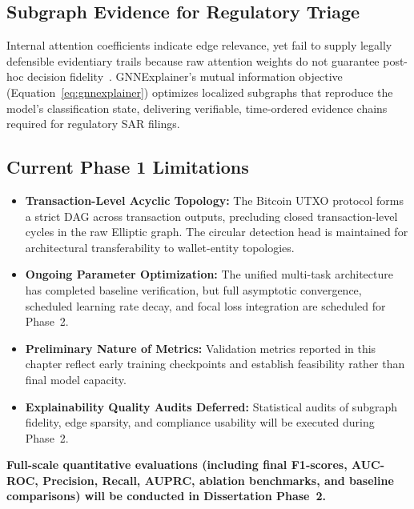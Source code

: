 \subsection{Subgraph Evidence for Regulatory Triage}

Internal attention coefficients indicate edge relevance, yet fail to supply legally defensible evidentiary trails because raw attention weights do not guarantee post-hoc decision fidelity~\cite{jain2019attention}. GNNExplainer's mutual information objective (Equation~\ref{eq:gnnexplainer}) optimizes localized subgraphs that reproduce the model's classification state, delivering verifiable, time-ordered evidence chains required for regulatory SAR filings.

\subsection{Current Phase 1 Limitations}

\begin{itemize}
    \item \textbf{Transaction-Level Acyclic Topology:} The Bitcoin UTXO protocol forms a strict DAG across transaction outputs, precluding closed transaction-level cycles in the raw Elliptic graph. The circular detection head is maintained for architectural transferability to wallet-entity topologies.
    \item \textbf{Ongoing Parameter Optimization:} The unified multi-task architecture has completed baseline verification, but full asymptotic convergence, scheduled learning rate decay, and focal loss integration are scheduled for Phase~2.
    \item \textbf{Preliminary Nature of Metrics:} Validation metrics reported in this chapter reflect early training checkpoints and establish feasibility rather than final model capacity.
    \item \textbf{Explainability Quality Audits Deferred:} Statistical audits of subgraph fidelity, edge sparsity, and compliance usability will be executed during Phase~2.
\end{itemize}

\noindent \textbf{Full-scale quantitative evaluations (including final F1-scores, AUC-ROC, Precision, Recall, AUPRC, ablation benchmarks, and baseline comparisons) will be conducted in Dissertation Phase~2.}

